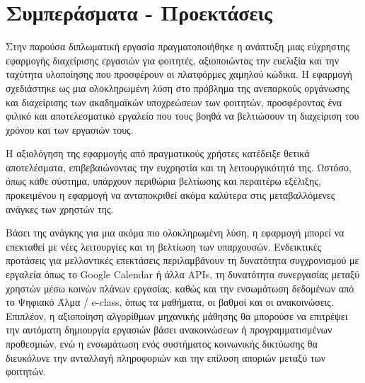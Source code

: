 \chapter{Συμπεράσματα - Προεκτάσεις}
    Στην παρούσα διπλωματική εργασία πραγματοποιήθηκε η ανάπτυξη μιας εύχρηστης εφαρμογής διαχείρισης εργασιών για φοιτητές, αξιοποιώντας την ευελιξία και την ταχύτητα υλοποίησης που προσφέρουν οι πλατφόρμες χαμηλού κώδικα. Η εφαρμογή σχεδιάστηκε ως μια ολοκληρωμένη λύση στο πρόβλημα της ανεπαρκούς οργάνωσης και διαχείρισης των ακαδημαϊκών υποχρεώσεων των φοιτητών, προσφέροντας ένα φιλικό και αποτελεσματικό εργαλείο που τους βοηθά να βελτιώσουν τη διαχείριση του χρόνου και των εργασιών τους.

    Η αξιολόγηση της εφαρμογής από πραγματικούς χρήστες κατέδειξε θετικά αποτελέσματα, επιβεβαιώνοντας την ευχρηστία και τη λειτουργικότητά της. Ωστόσο, όπως κάθε σύστημα, υπάρχουν περιθώρια βελτίωσης και περαιτέρω εξέλιξης, προκειμένου η εφαρμογή να ανταποκριθεί ακόμα καλύτερα στις μεταβαλλόμενες ανάγκες των χρηστών της.

    Βάσει της ανάγκης για μια ακόμα πιο ολοκληρωμένη λύση, η εφαρμογή μπορεί να επεκταθεί με νέες λειτουργίες και τη βελτίωση των υπαρχουσών. Ενδεικτικές προτάσεις για μελλοντικές επεκτάσεις περιλαμβάνουν τη δυνατότητα συγχρονισμού με εργαλεία όπως το Google Calendar ή άλλα APIs, τη δυνατότητα συνεργασίας μεταξύ χρηστών μέσω κοινών πλάνων εργασίας, καθώς και την ενσωμάτωση δεδομένων από το Ψηφιακό Άλμα / e-class, όπως τα μαθήματα, οι βαθμοί και οι ανακοινώσεις. Επιπλέον, η αξιοποίηση αλγορίθμων μηχανικής μάθησης θα μπορούσε να επιτρέψει την αυτόματη δημιουργία εργασιών βάσει ανακοινώσεων ή προγραμματισμένων προθεσμιών, ενώ η ενσωμάτωση ενός συστήματος κοινωνικής δικτύωσης θα διευκόλυνε την ανταλλαγή πληροφοριών και την επίλυση αποριών μεταξύ των φοιτητών.
